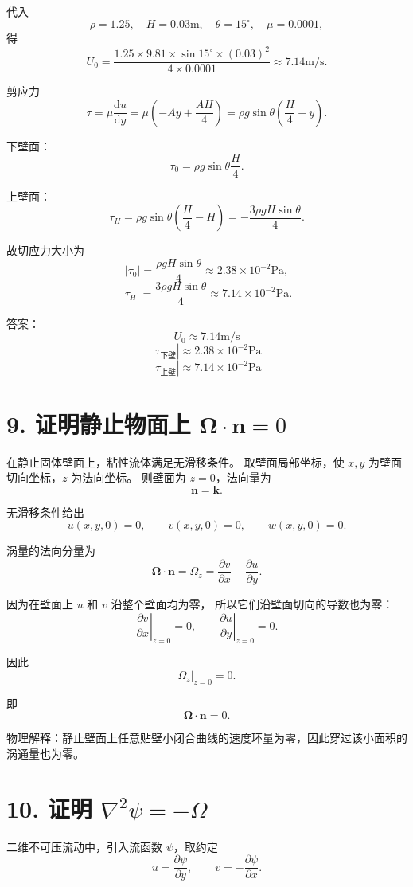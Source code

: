 \documentclass[12pt,a4paper]{ctexart}
\newcommand{\dd}{\mathrm d}
\begin{document}
代入
\[
\rho=1.25,\quad
H=0.03\mathrm m,\quad
\theta=15^\circ,\quad
\mu=0.0001,
\]
得
\[
U_0=
\frac{1.25\times9.81\times\sin15^\circ\times(0.03)^2}{4\times0.0001}
\approx7.14\mathrm{m/s}.
\]

剪应力
\[
\tau=\mu\frac{\dd u}{\dd y}
=\mu\left(-Ay+\frac{AH}{4}\right)
=\rho g\sin\theta\left(\frac H4-y\right).
\]

下壁面：
\[
\tau_0=\rho g\sin\theta\frac H4.
\]

上壁面：
\[
\tau_H=\rho g\sin\theta\left(\frac H4-H\right)
=-\frac{3\rho gH\sin\theta}{4}.
\]

故切应力大小为
\[
|\tau_0|
=\frac{\rho gH\sin\theta}{4}
\approx2.38\times10^{-2}\mathrm{Pa},
\]
\[
|\tau_H|
=\frac{3\rho gH\sin\theta}{4}
\approx7.14\times10^{-2}\mathrm{Pa}.
\]

答案：
\[
\boxed{U_0\approx7.14\mathrm{m/s}}
\]
\[
\boxed{|\tau_{\text{下壁}}|\approx2.38\times10^{-2}\mathrm{Pa}}
\]
\[
\boxed{|\tau_{\text{上壁}}|\approx7.14\times10^{-2}\mathrm{Pa}}
\]

\section*{9. 证明静止物面上 \(\bm\Omega\cdot\bm n=0\)}

在静止固体壁面上，粘性流体满足无滑移条件。
取壁面局部坐标，使 \(x,y\) 为壁面切向坐标，\(z\) 为法向坐标。
则壁面为 \(z=0\)，法向量为
\[
\bm n=\bm k.
\]

无滑移条件给出
\[
u(x,y,0)=0,\qquad v(x,y,0)=0,\qquad w(x,y,0)=0.
\]

涡量的法向分量为
\[
\bm\Omega\cdot\bm n
=\Omega_z
=\frac{\partial v}{\partial x}
-\frac{\partial u}{\partial y}.
\]

因为在壁面上 \(u\) 和 \(v\) 沿整个壁面均为零，
所以它们沿壁面切向的导数也为零：
\[
\left.\frac{\partial v}{\partial x}\right|_{z=0}=0,
\qquad
\left.\frac{\partial u}{\partial y}\right|_{z=0}=0.
\]

因此
\[
\left.\Omega_z\right|_{z=0}=0.
\]

即
\[
\boxed{
\bm\Omega\cdot\bm n=0.
}
\]

物理解释：静止壁面上任意贴壁小闭合曲线的速度环量为零，因此穿过该小面积的涡通量也为零。

\section*{10. 证明 \(\nabla^2\psi=-\Omega\)}

二维不可压流动中，引入流函数 \(\psi\)，取约定
\[
u=\frac{\partial\psi}{\partial y},
\qquad
v=-\frac{\partial\psi}{\partial x}.
\]
\end{document}
